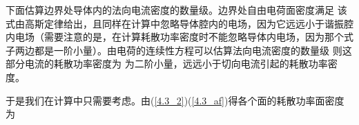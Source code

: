     下面估算边界处导体内的法向电流密度的数量级。边界处自由电荷面密度满足
    该式由高斯定律给出，且同样在计算中忽略导体腔内的电场，因为它远远小于谐振腔内电场\nota{\e}（需要注意的是，在计算耗散功率密度时不能忽略导体内电场，因为那个式子两边都是一阶小量）。由电荷的连续性方程可以估算法向电流密度的数量级
    则这部分电流的耗散功率密度为
    为二阶小量，远远小于切向电流引起的耗散功率密度。
    
    于是我们在计算中只需要考虑。由(\ref{4.3_2})(\ref{4.3_af})得各个面的耗散功率面密度为
    
    
